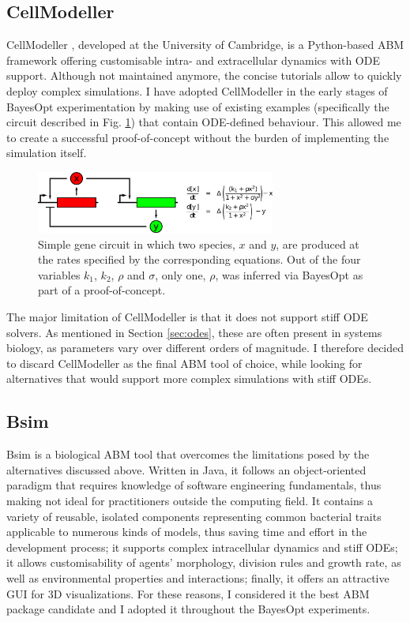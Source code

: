 \documentclass[bsc,frontabs,singlespacing,parskip,deptreport]{infthesis}
\begin{document}
\subsection{CellModeller}\label{sec:cellmodeller}
CellModeller \cite{pmid23651288}, developed at the University of Cambridge, is a Python-based ABM framework offering customisable intra- and extracellular dynamics with ODE support. Although not maintained anymore, the concise tutorials allow to quickly deploy complex simulations. I have adopted CellModeller in the early stages of BayesOpt experimentation by making use of existing examples (specifically the circuit described in Fig. \ref{fig:cellmodeller}) that contain ODE-defined behaviour. This allowed me to create a successful proof-of-concept without the burden of implementing the simulation itself. 

\begin{figure}
    \centering
    \includegraphics[width=0.7\textwidth]{Images/Other/CellModeller_tutorial2b_circuit.pdf}
    \caption{Simple gene circuit in which two species, $x$ and $y$, are produced at the rates specified by the corresponding equations. Out of the four variables $k_{1}$, $k_{2}$, $\rho$ and $\sigma$, only one, $\rho$, was inferred via BayesOpt as part of a proof-of-concept.}
    \label{fig:cellmodeller}
\end{figure}

The major limitation of CellModeller is that it does not support stiff ODE solvers. As mentioned in Section \ref{sec:odes}, these are often present in systems biology, as parameters vary over different orders of magnitude. I therefore decided to discard CellModeller as the final ABM tool of choice, while looking for alternatives that would support more complex simulations with stiff ODEs.

\subsection{Bsim}\label{sec:bsim}
Bsim \cite{pmid22936991, pmid28585809} is a biological ABM tool that overcomes the limitations posed by the alternatives discussed above. Written in Java, it follows an object-oriented paradigm that requires knowledge of software engineering fundamentals, thus making not ideal for practitioners outside the computing field. It contains a variety of reusable, isolated components representing common bacterial traits applicable to numerous kinds of models, thus saving time and effort in the development process; it supports complex intracellular dynamics and stiff ODEs; it allows customisability of agents' morphology, division rules and growth rate, as well as environmental properties and interactions; finally, it offers an attractive GUI for 3D visualizations. For these reasons, I considered it the best ABM package candidate and I adopted it throughout the BayesOpt experiments.
\end{document}
